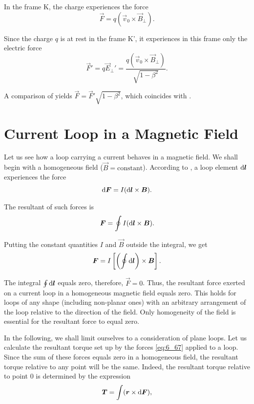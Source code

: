 In the frame K, the charge experiences the force
\begin{equation}\label{eq:6_65}
    \vec{F} = q (\vec{v}_0 \times \vec{B}_{\perp}).
\end{equation}

\noindent
Since the charge $q$ is at rest in the frame K', it experiences in this frame only the electric force
\begin{equation}\label{eq:6_66}
    \vec{F}' = q \vec{E}_{\perp}' = \frac{q (\vec{v}_0 \times \vec{B}_{\perp})}{\sqrt{1-\beta^2}}.
\end{equation}

\noindent
A comparison of  yields $\vec{F} = \vec{F}' \sqrt{1-\beta^2}$, which coincides with .

\section{Current Loop in a Magnetic Field}\label{sec:6_8}

Let us see how a loop carrying a current behaves in a magnetic field. We shall begin with a homogeneous field ($\vec{B}=\text{constant}$). According to , a loop element $\mathrm{d}\boldsymbol{l}$ experiences the force
\begin{equation}\label{eq:6_67}
    \mathrm{d}\boldsymbol{F} = I (\mathrm{d}\boldsymbol{l}\times\boldsymbol{B}).
\end{equation}

\noindent
The resultant of such forces is
\begin{equation}\label{eq:6_68}
    \boldsymbol{F} = \oint I (\mathrm{d}\boldsymbol{l}\times\boldsymbol{B}).
\end{equation}

\noindent
Putting the constant quantities $I$ and $\vec{B}$ outside the integral, we get
\begin{equation*}
    \boldsymbol{F} = I \left[ \left(\oint \mathrm{d}\boldsymbol{l} \right) \times \boldsymbol{B} \right].
\end{equation*}

\noindent
The integral $\oint\mathrm{d}\boldsymbol{l}$ equals zero, therefore, $\vec{F}=0$. Thus, the resultant force exerted on a current loop in a homogeneous magnetic field equals zero. This holds for loops of any shape (including non-planar ones) with an arbitrary arrangement of the loop relative to the direction of the field. Only homogeneity of the field is essential for the resultant force to equal zero.

In the following, we shall limit ourselves to a consideration of plane loops. Let us calculate the resultant torque set up by the forces \eqref{eq:6_67} applied to a loop. Since the sum of these forces equals zero in a homogeneous field, the resultant torque relative to any point will be the same. Indeed, the resultant torque relative to point $0$ is determined by the expression
\begin{equation*}
    \boldsymbol{T} = \int (\boldsymbol{r} \times \mathrm{d}\boldsymbol{F}),
\end{equation*}

